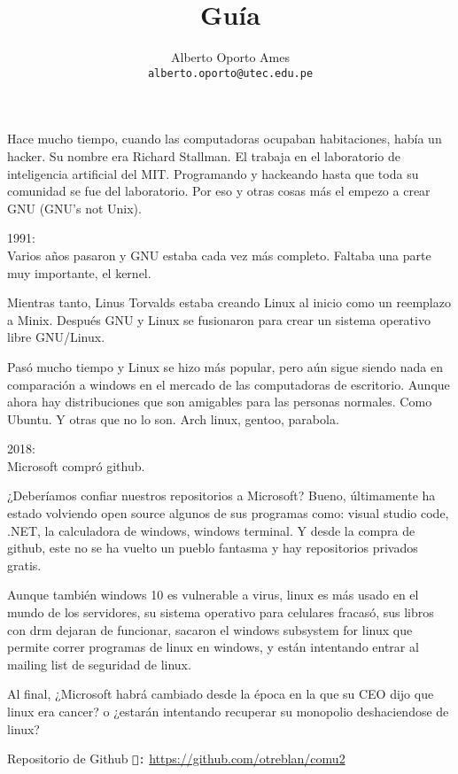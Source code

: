 \documentclass[12pt]{article}
\title{\textbf{Guía}}
\author{
		Alberto Oporto Ames\\
		\texttt{alberto.oporto@utec.edu.pe}
		}
\begin{document}
\maketitle
\thispagestyle{fancy}

Hace mucho tiempo, cuando las computadoras ocupaban habitaciones, había un hacker.
Su nombre era Richard Stallman.
El trabaja en el laboratorio de inteligencia artificial del MIT.
Programando y hackeando hasta que toda su comunidad se fue del laboratorio.
Por eso y otras cosas más el empezo a crear GNU (GNU's not Unix).

1991:\\
Varios años pasaron y GNU estaba cada vez más completo.
Faltaba una parte muy importante, el kernel.

Mientras tanto, Linus Torvalds estaba creando Linux al inicio como un reemplazo a Minix.
Después GNU y Linux se fusionaron para crear un sistema operativo libre GNU/Linux.

Pasó mucho tiempo y Linux se hizo más popular,
pero aún sigue siendo nada en comparación a windows en el mercado de las computadoras de escritorio.
Aunque ahora hay distribuciones que son amigables para las personas normales.
Como Ubuntu.
Y otras que no lo son.
Arch linux, gentoo, parabola.

2018:\\
Microsoft compró github.

¿Deberíamos confiar nuestros repositorios a Microsoft?
Bueno, últimamente ha estado volviendo open source algunos de sus programas como: visual studio code, .NET, la calculadora de windows, windows terminal.
Y desde la compra de github, este no se ha vuelto un pueblo fantasma y hay repositorios privados gratis.

Aunque también windows 10 es vulnerable a virus,
linux es más usado en el mundo de los servidores,
su sistema operativo para celulares fracasó,
sus libros con drm dejaran de funcionar,
sacaron el windows subsystem for linux que permite correr programas de linux en windows,
y están intentando entrar al mailing list de seguridad de linux.

Al final, ¿Microsoft habrá cambiado desde la época en la que su CEO dijo que linux era cancer?
o ¿estarán intentando recuperar su monopolio deshaciendose de linux?

\vfill
Repositorio de Github \texttt{:} \url{https://github.com/otreblan/comu2}
\end{document}
